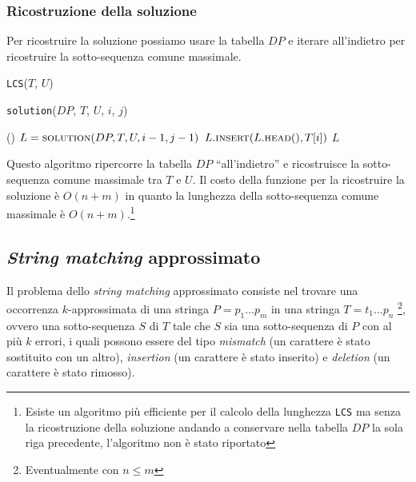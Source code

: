         \subsubsection{Ricostruzione della soluzione}
            Per ricostruire la soluzione possiamo usare la tabella $DP$ e iterare all'indietro per ricostruire la sotto-sequenza comune massimale.
            \begin{algorithm}[H]
                \caption{\Int \texttt{LCS}(\Item[] $T$, \Item[] $U$)}
                \begin{algorithmic}
                    \State [...] 
                    \State \Return {}
                \end{algorithmic}
            \end{algorithm}
            \begin{algorithm}[H]
                \caption{\List \texttt{solution}(\Int[][] $DP$, \Item[] $T$, \Item[] $U$, \Int $i$, \Int $j$)}
                \begin{algorithmic}
                        \State \Return \List()
                    \EndIf
                        \State \List $L = \Call{solution}{DP, T, U, i-1, j-1}$
                        \State $L.\Call{insert}{L.\textsc{head}(), T[i]}$
                        \State \Return $L$
                    \Else
                            \State \Return {}
                        \Else
                            \State \Return {}
                        \EndIf
                    \EndIf
                \end{algorithmic}
            \end{algorithm}
            Questo algoritmo ripercorre la tabella $DP$ ``all'indietro'' e ricostruisce la sotto-sequenza comune massimale tra $T$ e $U$.\newline
            Il costo della funzione per la ricostruire la soluzione è $O(n+m)$ in quanto la lunghezza della sotto-sequenza comune massimale è $O(n+m)$.\footnote{Esiste un algoritmo più efficiente per il calcolo della lunghezza \texttt{LCS} ma senza la ricostruzione della soluzione andando a conservare nella tabella $DP$ la sola riga precedente, l'algoritmo non è stato riportato}
    \subsection{\textit{String matching} approssimato}
        Il problema dello \textit{string matching} approssimato consiste nel trovare una occorrenza $k$-approssimata di una stringa $P=p_1\dots p_m$ in una stringa $T=t_1\dots p_n$ \footnote{Eventualmente con $n\leq m$}, ovvero una sotto-sequenza $S$ di $T$ tale che $S$ sia una sotto-sequenza di $P$ con al più $k$ errori, i quali possono essere del tipo \textit{mismatch} (un carattere è stato sostituito con un altro), \textit{insertion} (un carattere è stato inserito) e \textit{deletion} (un carattere è stato rimosso).
